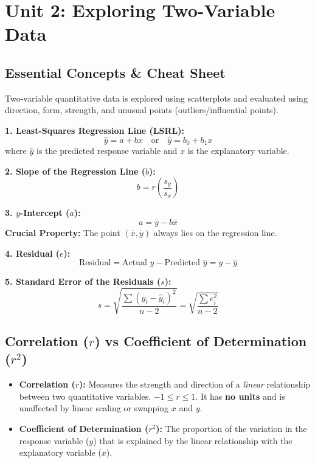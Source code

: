 \chapter{Unit 2: Exploring Two-Variable Data}

\section{Essential Concepts \& Cheat Sheet}

Two-variable quantitative data is explored using scatterplots and evaluated using direction, form, strength, and unusual points (outliers/influential points).

\begin{formulabox}
\textbf{1. Least-Squares Regression Line (LSRL):}
\[
\hat{y} = a + bx \quad \text{or} \quad \hat{y} = b_0 + b_1 x
\]
where $\hat{y}$ is the predicted response variable and $x$ is the explanatory variable.

\textbf{2. Slope of the Regression Line ($b$):}
\[
b = r \left(\frac{s_y}{s_x}\right)
\]

\textbf{3. $y$-Intercept ($a$):}
\[
a = \bar{y} - b\bar{x}
\]
\textbf{Crucial Property:} The point $(\bar{x}, \bar{y})$ always lies on the regression line.

\textbf{4. Residual ($e$):}
\[
\text{Residual} = \text{Actual } y - \text{Predicted } \hat{y} = y - \hat{y}
\]

\textbf{5. Standard Error of the Residuals ($s$):}
\[
s = \sqrt{\frac{\sum (y_i - \hat{y}_i)^2}{n - 2}} = \sqrt{\frac{\sum e_i^2}{n - 2}}
\]
\end{formulabox}

\section{Correlation ($r$) vs Coefficient of Determination ($r^2$)}

\begin{itemize}
    \item \textbf{Correlation ($r$):} Measures the strength and direction of a \emph{linear} relationship between two quantitative variables. $-1 \le r \le 1$. It has \textbf{no units} and is unaffected by linear scaling or swapping $x$ and $y$.
    \item \textbf{Coefficient of Determination ($r^2$):} The proportion of the variation in the response variable ($y$) that is explained by the linear relationship with the explanatory variable ($x$).
\end{itemize}

